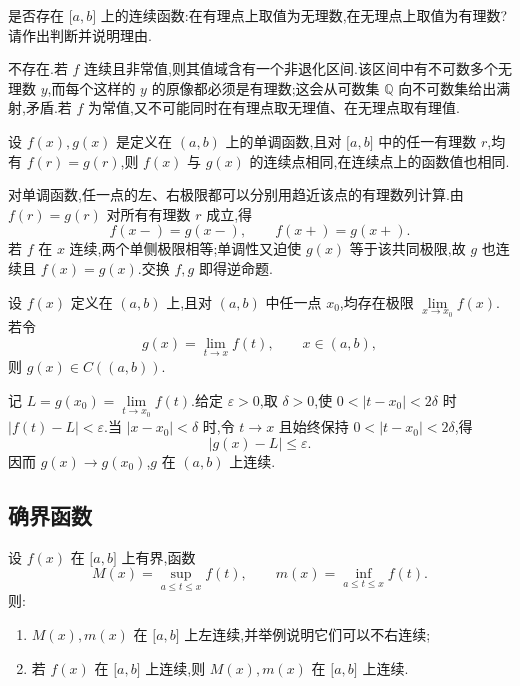 \begin{example}
    是否存在 $\lbrack a,b\rbrack$ 上的连续函数:在有理点上取值为无理数,在无理点上取值为有理数?请作出判断并说明理由.
\end{example}
\exampleblank

\begin{solution}
    不存在.若 $f$ 连续且非常值,则其值域含有一个非退化区间.该区间中有不可数多个无理数 $y$,而每个这样的 $y$ 的原像都必须是有理数;这会从可数集 $\mathbb Q$ 向不可数集给出满射,矛盾.若 $f$ 为常值,又不可能同时在有理点取无理值、在无理点取有理值.
\end{solution}

\begin{example}
    设 $f(x),g(x)$ 是定义在 $(a,b)$ 上的单调函数,且对 $\lbrack a,b\rbrack$ 中的任一有理数 $r$,均有 $f(r)=g(r)$,则 $f(x)$ 与 $g(x)$ 的连续点相同,在连续点上的函数值也相同.
\end{example}
\exampleblank

\begin{solution}
    对单调函数,任一点的左、右极限都可以分别用趋近该点的有理数列计算.由 $f(r)=g(r)$ 对所有有理数 $r$ 成立,得
    \[
        f(x-)=g(x-),\qquad f(x+)=g(x+).
    \]
    若 $f$ 在 $x$ 连续,两个单侧极限相等;单调性又迫使 $g(x)$ 等于该共同极限,故 $g$ 也连续且 $f(x)=g(x)$.交换 $f,g$ 即得逆命题.
\end{solution}

\begin{example}
    设 $f(x)$ 定义在 $(a,b)$ 上,且对 $(a,b)$ 中任一点 $x_0$,均存在极限 $\displaystyle\lim\limits_{x\to x_0}f(x)$.若令
    \[
        g(x)=\lim\limits_{t\to x}f(t),
        \qquad x\in(a,b),
    \]
    则 $g(x)\in C((a,b))$.
\end{example}
\exampleblank

\begin{solution}
    记 $L=g(x_0)=\displaystyle\lim\limits_{t\to x_0}f(t)$.给定 $\varepsilon>0$,取 $\delta>0$,使 $0<|t-x_0|<2\delta$ 时 $|f(t)-L|<\varepsilon$.当 $|x-x_0|<\delta$ 时,令 $t\to x$ 且始终保持 $0<|t-x_0|<2\delta$,得
    \[
        |g(x)-L|\leq\varepsilon.
    \]
    因而 $g(x)\to g(x_0)$,$g$ 在 $(a,b)$ 上连续.
\end{solution}



\subsection{确界函数}

\begin{example}
    设 $f(x)$ 在 $\lbrack a,b\rbrack$ 上有界,函数
    \[
        M(x)=\sup\limits_{a\leq t\leq x}f(t),
        \qquad
        m(x)=\inf\limits_{a\leq t\leq x}f(t).
    \]
    则:
    \begin{enumerate}
        \item $M(x),m(x)$ 在 $\lbrack a,b\rbrack$ 上左连续,并举例说明它们可以不右连续;
        \item 若 $f(x)$ 在 $\lbrack a,b\rbrack$ 上连续,则 $M(x),m(x)$ 在 $\lbrack a,b\rbrack$ 上连续.
    \end{enumerate}
\end{example}
\exampleblank

